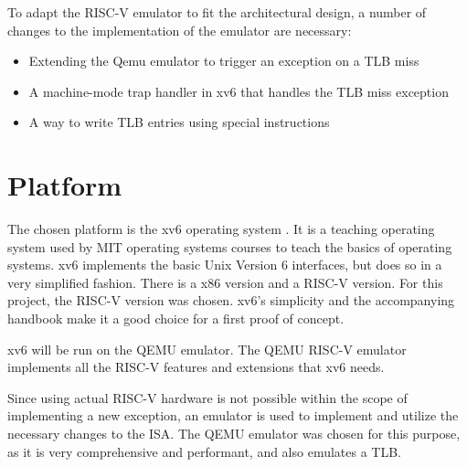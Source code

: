 To adapt the RISC-V emulator to fit the architectural design, a number of changes to the implementation of the emulator are necessary:

\begin{itemize}
    \item Extending the Qemu emulator to trigger an exception on a TLB miss
    \item A machine-mode trap handler in xv6 that handles the TLB miss exception
    \item A way to write TLB entries using special instructions
\end{itemize}


\section{Platform}
The chosen platform is the xv6 operating system \cite{xv6source}. It is a teaching operating system
used by MIT operating systems courses to teach the basics of operating systems.
xv6 implements the basic Unix Version 6 interfaces, but does so in a very simplified fashion.
There is a x86 version and a RISC-V version. For this project, the RISC-V version was chosen.
xv6's simplicity and the accompanying handbook \cite{cox2011xv6} make it a good choice for a first
proof of concept.

xv6 will be run on the QEMU \cite{QEMUSource2024} emulator. The QEMU RISC-V emulator implements
all the RISC-V features and extensions that xv6 needs.

Since using actual RISC-V hardware is not possible within the scope of implementing a new exception, an emulator is used to implement and utilize the necessary changes to the ISA. The QEMU emulator was chosen for this purpose, as it is very comprehensive and performant, and also emulates a TLB.




